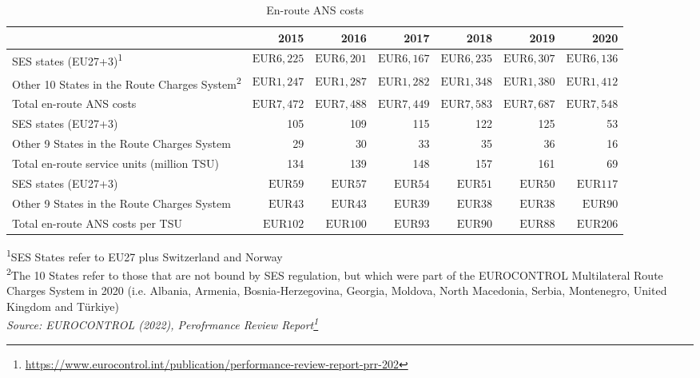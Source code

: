 \documentclass[
  11pt,
  a4paper,
]{book}
\DeclareRobustCommand{\href}[2]{#2\footnote{\url{#1}}}
\begin{document}
\hypertarget{tbl-ans-costs}{}
\setlength{\LTpost}{0mm}
\begin{longtable}{lrrrrrr}
\caption{\label{tbl-ans-costs}En-route ANS costs }\tabularnewline

\toprule
  & 2015 & 2016 & 2017 & 2018 & 2019 & 2020 \\ 
\midrule
SES states (EU27+3)\textsuperscript{1} & $\text{EUR}6,225$ & $\text{EUR}6,201$ & $\text{EUR}6,167$ & $\text{EUR}6,235$ & $\text{EUR}6,307$ & $\text{EUR}6,136$ \\ 
Other 10 States in the Route Charges System\textsuperscript{2} & $\text{EUR}1,247$ & $\text{EUR}1,287$ & $\text{EUR}1,282$ & $\text{EUR}1,348$ & $\text{EUR}1,380$ & $\text{EUR}1,412$ \\ 
Total en-route ANS costs & $\text{EUR}7,472$ & $\text{EUR}7,488$ & $\text{EUR}7,449$ & $\text{EUR}7,583$ & $\text{EUR}7,687$ & $\text{EUR}7,548$ \\ 
SES states (EU27+3) & 105 & 109 & 115 & 122 & 125 & 53 \\ 
Other 9 States in the Route Charges System & 29 & 30 & 33 & 35 & 36 & 16 \\ 
Total en-route service units (million TSU) & 134 & 139 & 148 & 157 & 161 & 69 \\ 
SES states (EU27+3) & $\text{EUR}59$ & $\text{EUR}57$ & $\text{EUR}54$ & $\text{EUR}51$ & $\text{EUR}50$ & $\text{EUR}117$ \\ 
Other 9 States in the Route Charges System & $\text{EUR}43$ & $\text{EUR}43$ & $\text{EUR}39$ & $\text{EUR}38$ & $\text{EUR}38$ & $\text{EUR}90$ \\ 
Total en-route ANS costs per TSU & $\text{EUR}102$ & $\text{EUR}100$ & $\text{EUR}93$ & $\text{EUR}90$ & $\text{EUR}88$ & $\text{EUR}206$ \\ 
\bottomrule
\end{longtable}
\begin{minipage}{\linewidth}
\textsuperscript{1}SES States refer  to  EU27  plus  Switzerland and Norway\\
\textsuperscript{2}The 10 States refer to those that are not bound by SES regulation, but which were part of the EUROCONTROL Multilateral Route Charges System in 2020 (i.e. Albania, Armenia, Bosnia‐Herzegovina, Georgia, Moldova, North Macedonia, Serbia, Montenegro, United Kingdom and Türkiye)\\
\emph{Source: \href{https://www.eurocontrol.int/publication/performance-review-report-prr-202}{EUROCONTROL (2022), Perofrmance Review Report}}\\
\end{minipage}
\end{document}
